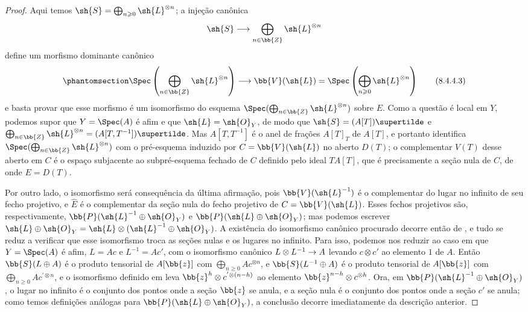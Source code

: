 \documentclass[oneside,10pt]{amsart}
\makeatletter
\renewcommand{\geq}{\geqslant}
\newcommand{\ega@arrow}[2]{\mathchoice{#1}{#2}{#2}{#2}}
\renewcommand{\to}{\ega@arrow{\longrightarrow}{\rightarrow}}
\newcommand{\oldpage}[2][]{\marginnote{\normalfont\footnotesize\textbf{#1}~|~#2}\ignorespaces}
\let\EGAOriginalLabel\label
\renewcommand{\label}[1]{\phantomsection\EGAOriginalLabel{#1}}
\newcommand*{\ega@labelnumber}[1]{\StrBehind{#1}{.}}
\newcommand{\eref}[1]{\hyperref[#1]{\normalfont{(\ega@labelnumber{#1})}}}
\makeatother
\begin{document}
\begin{proof}
Aqui temos $\sh{S}=\bigoplus_{n\geq0}\sh{L}^{\otimes n}$;
a injeção canônica
\[
  \sh{S} \to \bigoplus_{n\in\bb{Z}} \sh{L}^{\otimes n}
\]
define um morfismo dominante canônico
\[
\label{eq:2.8.4.4.3}
  \Spec\left(
    \bigoplus_{n\in\bb{Z}} \sh{L}^{\otimes n}
  \right)
  \to
  \bb{V}(\sh{L})
  =
  \Spec\left(
    \bigoplus_{n\geq0} \sh{L}^{\otimes n}
  \right)
\tag{8.4.4.3}
\]
e basta provar que esse morfismo é um isomorfismo do esquema $\Spec(\bigoplus_{n\in\bb{Z}} \sh{L}^{\otimes n})$ sobre $E$.
Como a questão é local em $Y$, podemos supor que $Y=\Spec(A)$ é afim
\oldpage[II]{169}
e que $\sh{L}=\sh{O}_Y$, de modo que $\sh{S}=(A[T])\supertilde$ e $\bigoplus_{n\in\bb{Z}}\sh{L}^{\otimes n} = (A[T,T^{-1}])\supertilde$.
Mas $A[T,T^{-1}]$ é o anel de frações $A[T]_T$ de $A[T]$, e portanto \eref{eq:2.8.4.4.3} identifica $\Spec(\bigoplus_{n\in\bb{Z}}\sh{L}^{\otimes n})$ com o pré-esquema induzido por $C=\bb{V}(\sh{L})$ no aberto $D(T)$;
o complementar $V(T)$ desse aberto em $C$ é o espaço subjacente ao subpré-esquema fechado de $C$ definido pelo ideal $TA[T]$, que é precisamente a seção nula de $C$, de onde $E=D(T)$.

Por outro lado, o isomorfismo \eref{eq:2.8.4.4.2} será consequência da última afirmação, pois $\bb{V}(\sh{L}^{-1})$ é o complementar do lugar no infinito de seu fecho projetivo, e $\widehat{E}$ é o complementar da seção nula do fecho projetivo de $C=\bb{V}(\sh{L})$.
Esses fechos projetivos são, respectivamente, $\bb{P}(\sh{L}^{-1}\oplus\sh{O}_Y)$ e $\bb{P}(\sh{L}\oplus\sh{O}_Y)$;
mas podemos escrever $\sh{L}\oplus\sh{O}_Y = \sh{L}\otimes(\sh{L}^{-1}\oplus\sh{O}_Y)$.
A existência do isomorfismo canônico procurado decorre então de , e tudo se reduz a verificar que esse isomorfismo troca as seções nulas e os lugares no infinito.
Para isso, podemos nos reduzir ao caso em que $Y=\Spec(A)$ é afim, $L=Ac$ e $L^{-1}=Ac'$, com o isomorfismo canônico $L\otimes L^{-1}\to A$ levando $c\otimes c'$ ao elemento $1$ de $A$.
Então $\bb{S}(L\oplus A)$ é o produto tensorial de $A[\bb{z}]$ com $\bigoplus_{n\geq0}Ac^{\otimes n}$, e $\bb{S}(L^{-1}\oplus A)$ é o produto tensorial de $A[\bb{z}]$ com $\bigoplus_{n\geq0}Ac^{'\otimes n}$, e o isomorfismo definido em  leva $\bb{z}^h\otimes c^{'\otimes(n-h)}$ ao elemento $\bb{z}^{n-h}\otimes c^{\otimes h}$.
Ora, em $\bb{P}(\sh{L}^{-1}\oplus\sh{O}_Y)$, o lugar no infinito é o conjunto dos pontos onde a seção $\bb{z}$ se anula, e a seção nula é o conjunto dos pontos onde a seção $c'$ se anula;
como temos definições análogas para $\bb{P}(\sh{L}\oplus\sh{O}_Y)$, a conclusão decorre imediatamente da descrição anterior.
\end{proof}
\end{document}
